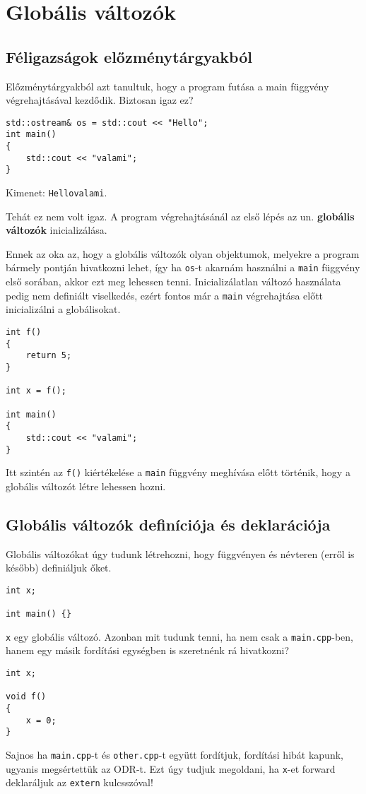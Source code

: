 \documentclass[a4paper,11.5pt]{article}
\begin{document}
	\section{Globális változók}
	\subsection{Féligazságok előzménytárgyakból}
	Előzménytárgyakból azt tanultuk, hogy a program futása a main függvény végrehajtásával kezdődik. Biztosan igaz ez?
	\begin{lstlisting}
std::ostream& os = std::cout << "Hello";
int main()
{
	std::cout << "valami";
}
	\end{lstlisting}
	Kimenet: \texttt{Hellovalami}.
	\medskip
	
	Tehát ez nem volt igaz. A program végrehajtásánál az első lépés az un. \textbf{globális változók} inicializálása. 
	
	Ennek az oka az, hogy a globális változók olyan objektumok, melyekre a program bármely pontján hivatkozni lehet, így ha \texttt{os}-t akarnám használni a \texttt{main} függvény első sorában, akkor ezt meg lehessen tenni. Inicializálatlan változó használata pedig nem definiált viselkedés, ezért fontos már a \texttt{main} végrehajtása előtt inicializálni a globálisokat.
	\begin{lstlisting}
int f()
{
	return 5;
}

int x = f();

int main()
{
	std::cout << "valami";
}
	\end{lstlisting}
	Itt szintén az \texttt{f()} kiértékelése a \texttt{main} függvény meghívása előtt történik, hogy a globális változót létre lehessen hozni.
	\subsection{Globális változók definíciója és deklarációja}
	Globális változókat úgy tudunk létrehozni, hogy függvényen és névteren (erről is később) definiáljuk őket.
	\medskip
	
	\begin{lstlisting}
int x;

int main() {}
	\end{lstlisting}
	\texttt{x} egy globális változó. Azonban mit tudunk tenni, ha nem csak a \texttt{main.cpp}-ben, hanem egy másik fordítási egységben is szeretnénk rá hivatkozni?
	\medskip
	
	\begin{lstlisting}
int x;

void f() 
{
	x = 0;
}
	\end{lstlisting}
	Sajnos ha \texttt{main.cpp}-t és \texttt{other.cpp}-t együtt fordítjuk, fordítási hibát kapunk, ugyanis megsértettük az ODR-t. Ezt úgy tudjuk megoldani, ha \texttt{x}-et forward deklaráljuk az \texttt{extern} kulcsszóval!
	\medskip
	
\end{document}
